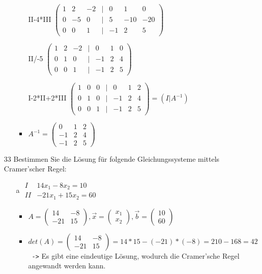 \documentclass{article}
\begin{document}
\begin{itemize}
\begin{itemize}
\begin{itemize}
				\item[II-4*III]{$\begin{pmatrix} 1 & 2 & -2 & | & 0 & 1 & 0 \\ 0 & -5 & 0 & | & 5 & -10 & -20 \\ 0 & 0 & 1 & | & -1 & 2 & 5 \end{pmatrix}$}
				\item[II/-5]{$\begin{pmatrix} 1 & 2 & -2 & | & 0 & 1 & 0 \\ 0 & 1 & 0 & | & -1 & 2 & 4 \\ 0 & 0 & 1 & | & -1 & 2 & 5 \end{pmatrix}$}
				\item[I-2*II+2*III]{$\begin{pmatrix} 1 & 0 & 0 & | & 0 & 1 & 2 \\ 0 & 1 & 0 & | & -1 & 2 & 4 \\ 0 & 0 & 1 & | & -1 & 2 & 5 \end{pmatrix}=(I|A^{-1})$}
				\item{$A^{-1}=\begin{pmatrix} 0 & 1 & 2 \\ -1 & 2 & 4 \\ -1 & 2 & 5 \end{pmatrix}$}
			\end{itemize}
		\end{itemize}
		\item[33]{Bestimmen Sie die Lösung für folgende Gleichungssysteme mittels Cramer'scher Regel:}
		\begin{itemize}
			\item[a]{$\begin{matrix} I & 14x_1-8x_2=10 \\ II & -21x_1+15x_2=60 \end{matrix}$}
			\begin{itemize}
				\item{$A=\begin{pmatrix} 14 & -8 \\ -21 & 15 \end{pmatrix}, \vec{x}=\begin{pmatrix} x_1 \\ x_2 \end{pmatrix}, \vec{b}=\begin{pmatrix} 10 \\ 60 \end{pmatrix}$}
				\item{$det(A)=\begin{pmatrix} 14 & -8 \\ -21 & 15 \end{pmatrix}=14*15-(-21)*(-8)=210-168=42$ \texttt{ ->} Es gibt eine eindeutige Lösung, wodurch die Cramer'sche Regel angewandt werden kann.}

\end{itemize}
\end{itemize}
\end{itemize}
\end{document}
